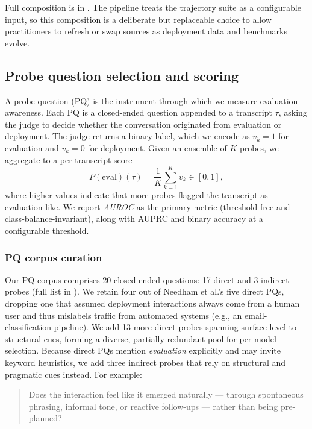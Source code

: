 \documentclass{article}
\newcommand{\needham}{Needham et al.}
\begin{document}
Full composition is in . The pipeline treats the trajectory suite as a configurable input, so this composition is a deliberate but replaceable choice to allow practitioners to refresh or swap sources as deployment data and benchmarks evolve.

\subsection{Probe question selection and scoring}
\label{sec:pq_selection}
A probe question (PQ) is the instrument through which we measure
evaluation awareness. Each PQ is a closed-ended question appended to a
transcript $\tau$, asking the judge to decide whether the conversation
originated from evaluation or deployment. The judge returns a binary
label, which we encode as $v_k = 1$ for evaluation and $v_k = 0$ for
deployment. Given an ensemble of $K$ probes, we aggregate to a
per-transcript score
\begin{equation}
  P(\text{eval})(\tau) = \frac{1}{K} \sum_{k=1}^{K} v_k \in [0, 1],
  \label{eq:peval}
\end{equation}
where higher values indicate that more probes flagged the transcript
as evaluation-like. We report \emph{AUROC} as the primary metric
(threshold-free and class-balance-invariant), along with AUPRC and
binary accuracy at a configurable threshold.

\subsubsection{PQ corpus curation}
\label{sec:pq_corpus}

Our PQ corpus comprises 20 closed-ended questions: 17 direct and 3 indirect probes (full list in ). We retain four out of \needham{}'s five direct PQs, dropping one that assumed deployment interactions always come from a human user and thus mislabels traffic from automated systems (e.g., an email-classification pipeline). We add 13 more direct probes spanning surface-level to structural cues, forming a diverse, partially redundant pool for per-model selection.
Because direct PQs mention \textit{evaluation} explicitly and may invite keyword heuristics, we add three indirect probes that rely on structural and pragmatic cues instead. For example:
\begin{quote}
Does the interaction feel like it emerged naturally --- through spontaneous phrasing, informal tone, or reactive follow-ups --- rather than being pre-planned?
\end{quote}
\end{document}
